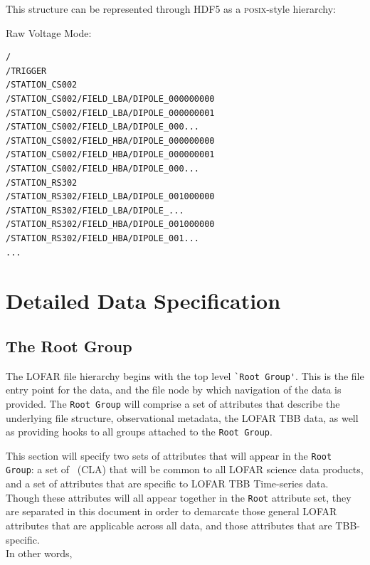 \documentclass[a4paper,10pt,bibtotoc]{scrartcl}
\begin{document}
This structure can be represented through HDF5 as a \textsc{posix}-style hierarchy:

Raw Voltage Mode:
\begin{verbatim}
/
/TRIGGER
/STATION_CS002
/STATION_CS002/FIELD_LBA/DIPOLE_000000000
/STATION_CS002/FIELD_LBA/DIPOLE_000000001
/STATION_CS002/FIELD_LBA/DIPOLE_000...
/STATION_CS002/FIELD_HBA/DIPOLE_000000000
/STATION_CS002/FIELD_HBA/DIPOLE_000000001
/STATION_CS002/FIELD_HBA/DIPOLE_000...
/STATION_RS302
/STATION_RS302/FIELD_LBA/DIPOLE_001000000
/STATION_RS302/FIELD_LBA/DIPOLE_...
/STATION_RS302/FIELD_HBA/DIPOLE_001000000
/STATION_RS302/FIELD_HBA/DIPOLE_001...
...
\end{verbatim}



\clearpage

\section{Detailed Data Specification}
\label{sec:detailed structure}



\subsection{The Root Group}
\label{sec:root group}

The LOFAR file hierarchy begins with the top level \verb|`Root Group'|.  This is
the file entry point for the data, and the file node by which navigation of
the data is provided. The \texttt{Root Group} will comprise a set of attributes
that describe the underlying file structure, observational metadata, the LOFAR
TBB data, as well as providing hooks to all groups attached to the \texttt{Root
  Group}.

This section will specify two sets of attributes that will appear in
the \texttt{Root Group}: a set of \cla\ (CLA) that will be common to
all LOFAR science data products, and a set of attributes that are
specific to LOFAR TBB Time-series data.  Though these attributes will
all appear together in the \texttt{Root} attribute set, they are
separated in this document in order to demarcate those general LOFAR
attributes that are applicable across all data, and those attributes
that are TBB-specific.\\
In other words,
\end{document}
